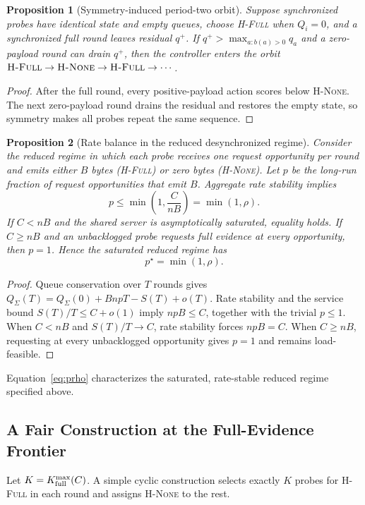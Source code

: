 \documentclass[10pt,journal]{IEEEtran}
\newtheorem{proposition}{Proposition}
\newcommand{\Hnone}{\textsc{H-None}}
\newcommand{\Hfull}{\textsc{H-Full}}
\begin{document}
\begin{proposition}[Symmetry-induced period-two orbit]
\label{prop:cycle}
Suppose synchronized probes have identical state and empty queues, choose
\Hfull{} when $Q_i=0$, and a synchronized full round leaves residual $q^+$.
If $q^+>\max_{a:b(a)>0}q_a$ and a zero-payload round can drain $q^+$, then
the controller enters the orbit
$\Hfull\rightarrow\Hnone\rightarrow\Hfull\rightarrow\cdots$.
\end{proposition}
\begin{proof}
After the full round, every positive-payload action scores below \Hnone{}.
The next zero-payload round drains the residual and restores the empty state,
so symmetry makes all probes repeat the same sequence.
\end{proof}

\begin{proposition}[Rate balance in the reduced desynchronized regime]
\label{prop:prho}
Consider the reduced regime in which each probe receives one request
opportunity per round and emits either $B$ bytes (\Hfull) or zero bytes
(\Hnone). Let $p$ be the long-run fraction of request opportunities that
emit $B$. Aggregate rate stability implies
\begin{equation}
p\leq \min\left(1,\frac{C}{nB}\right)=\min(1,\rho).
\label{eq:prhobound}
\end{equation}
If $C<nB$ and the shared server is asymptotically saturated, equality holds.
If $C\geq nB$ and an unbacklogged probe requests full evidence at every
opportunity, then $p=1$. Hence the saturated reduced regime has
\begin{equation}
p^\star=\min(1,\rho).
\label{eq:prho}
\end{equation}
\end{proposition}
\begin{proof}
Queue conservation over $T$ rounds gives
$Q_\Sigma(T)=Q_\Sigma(0)+Bn pT-S(T)+o(T)$. Rate stability and the service
bound $S(T)/T\leq C+o(1)$ imply $npB\leq C$, together with the trivial
$p\leq1$. When $C<nB$ and $S(T)/T\rightarrow C$, rate stability forces
$npB=C$. When $C\geq nB$, requesting at every unbacklogged opportunity gives
$p=1$ and remains load-feasible.
\end{proof}

Equation~\eqref{eq:prho} characterizes the saturated, rate-stable reduced
regime specified above.

\subsection{A Fair Construction at the Full-Evidence Frontier}
Let $K=K_{\rm full}^{\max}(C)$. A simple cyclic construction selects exactly
$K$ probes for \Hfull{} in each round and assigns \Hnone{} to the rest.
\end{document}
